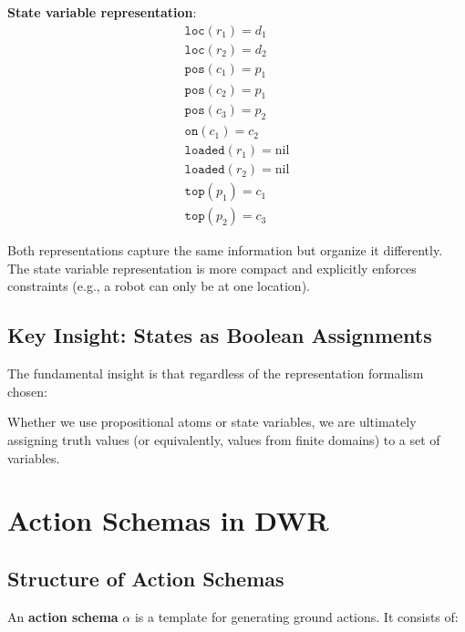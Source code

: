 \documentclass[11pt,a4paper]{article}
\theoremstyle{definition}
\theoremstyle{plain}
\theoremstyle{remark}
\begin{document}
\textbf{State variable representation}:
\[
\begin{array}{l}
\texttt{loc}(r_1) = d_1 \\
\texttt{loc}(r_2) = d_2 \\
\texttt{pos}(c_1) = p_1 \\
\texttt{pos}(c_2) = p_1 \\
\texttt{pos}(c_3) = p_2 \\
\texttt{on}(c_1) = c_2 \\
\texttt{loaded}(r_1) = \text{nil} \\
\texttt{loaded}(r_2) = \text{nil} \\
\texttt{top}(p_1) = c_1 \\
\texttt{top}(p_2) = c_3
\end{array}
\]

Both representations capture the same information but organize it differently. The state variable representation is more compact and explicitly enforces constraints (e.g., a robot can only be at one location).

\subsection{Key Insight: States as Boolean Assignments}

The fundamental insight is that regardless of the representation formalism chosen:

\begin{center}
\end{center}

Whether we use propositional atoms or state variables, we are ultimately assigning truth values (or equivalently, values from finite domains) to a set of variables.

\section{Action Schemas in DWR}

\subsection{Structure of Action Schemas}

An \textbf{action schema} $\alpha$ is a template for generating ground actions. It consists of:
\end{document}
